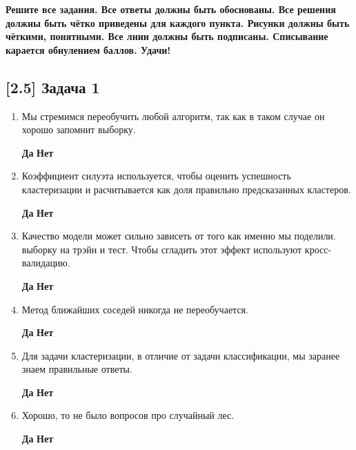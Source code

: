 \documentclass[12pt, a4paper, oneside]{article}
\begin{document}
\textbf{Решите все задания. Все ответы должны быть обоснованы. Все решения должны быть чётко приведены для каждого пункта. Рисунки должны быть чёткими, понятными. Все лнии должны быть подписаны. Списывание карается обнулением баллов. Удачи!}

\subsection*{[2.5] Задача 1 }
\begin{enumerate}
	
	\item  Мы стремимся переобучить любой алгоритм, так как в таком случае он хорошо запомнит выборку.
	
	\hspace{2cm} \textbf{Да}  \hspace{4cm} \textbf{Нет} 
	
	\item  Коэффициент силуэта используется, чтобы оценить успешность кластеризации и  расчитывается как доля правильно предсказанных кластеров.
	
	\hspace{2cm} \textbf{Да}  \hspace{4cm} \textbf{Нет} 
	
	\item  Качество модели может сильно зависеть от того как именно мы поделили. выборку на трэйн и тест. Чтобы сгладить этот эффект используют кросс-валидацию.
	
	\hspace{2cm} \textbf{Да}  \hspace{4cm} \textbf{Нет} 
	
	\item  Метод ближайших соседей никогда не переобучается. 
	
	\hspace{2cm} \textbf{Да}  \hspace{4cm} \textbf{Нет} 
	
	\item  Для задачи кластеризации, в отличие от задачи классификации, мы заранее знаем правильные ответы. 
	
	\hspace{2cm} \textbf{Да}  \hspace{4cm} \textbf{Нет} 
	
	\item  	Хорошо, то не было вопросов про случайный лес.
	
	\hspace{2cm} \textbf{Да}  \hspace{4cm} \textbf{Нет} 

\end{enumerate}
\end{document}
